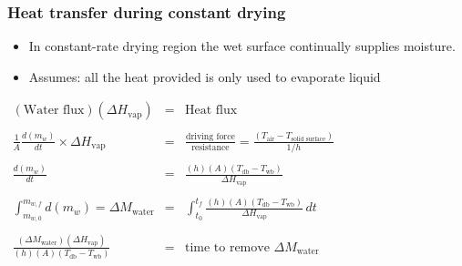 \begin{frame}\frametitle{Heat transfer during constant drying}
	\begin{itemize}
		\item	In constant-rate drying region the wet surface continually supplies moisture.
		\item	{\color{myOrange}Assumes}: all the heat provided is only used to evaporate liquid
	\end{itemize}
	\vspace{12pt}
	$\begin{array}{rcl}
		(\text{Water flux})(\Delta H_\text{vap})  							&=& \text{Heat flux}\\
		\\
		\displaystyle\frac{1}{A} \frac{d(m_w)}{dt} \times \Delta H_\text{vap} 	&=& \displaystyle\frac{\text{driving force}}{\text{resistance}} = \displaystyle\frac{(T_\text{air} - T_\text{solid surface}) }{1/h} \\
		\\
		\displaystyle \frac{d(m_w)}{dt}   										&=& \displaystyle\frac{(h)(A)(T_\text{db} - T_\text{wb})}{\Delta H_\text{vap}}  \\
		\\
		\displaystyle \int_{m_{w,0}}^{m_{w,f}}{d(m_w)} = \Delta M_\text{water}	&=& \displaystyle \int_{t_0}^{t_f}{\frac{(h)(A)(T_\text{db} - T_\text{wb})}{\Delta H_\text{vap}}\, dt} \\
		\\
		\displaystyle  \frac{(\Delta M_\text{water}) (\Delta H_\text{vap})}{(h)(A)(T_\text{db} - T_\text{wb})} &=& \text{time to remove $\Delta M_\text{water}$}
	\end{array}$
\end{frame}

